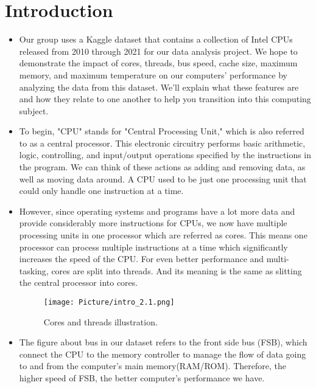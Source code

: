 \documentclass[a4paper]{article}
\begin{document}
\newpage
\section{Introduction}
\begin{itemize}
    
    \item[]Our group uses a Kaggle dataset that contains a collection of Intel CPUs released from 2010 through 2021 for our data analysis project. We hope to demonstrate the impact of cores, threads, bus speed, cache size, maximum memory, and maximum temperature on our computers' performance by analyzing the data from this dataset. We'll explain what these features are and how they relate to one another to help you transition into this computing subject.
    
    \item[]To begin, "CPU" stands for "Central Processing Unit," which is also referred to as a central processor. This electronic circuitry performs basic arithmetic, logic, controlling, and input/output operations specified by the instructions in the program. We can think of these actions as adding and removing data, as well as moving data around. A CPU used to be just one processing unit that could only handle one instruction at a time.
    
    \item[]However, since operating systems and programs have a lot more data and provide considerably more instructions for CPUs, we now have multiple processing units in one processor which are referred as cores. This means one processor can process multiple instructions at a time which significantly increases the speed of the CPU. For even better performance and multi-tasking, cores are split into threads. And its meaning is the same as slitting the central processor into cores.
    
    \begin{figure}[H]
        \centering
        \texttt{[image: Picture/intro\_2.1.png]}
        \caption{Cores and threads illustration.}
        \label{2.1}
    \end{figure}
    
    \item[]The figure about bus in our dataset refers to the front side bus (FSB), which connect the CPU to the memory controller to manage the flow of data going to and from the computer's main memory(RAM/ROM). Therefore, the higher speed of FSB, the better computer’s performance we have.
    

\end{itemize}
\end{document}
